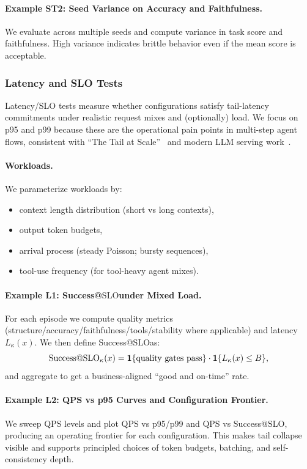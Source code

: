 \documentclass[11pt]{article}
\newcommand{\slo}{\ensuremath{\mathrm{SLO}}}
\begin{document}
\paragraph{Example ST2: Seed Variance on Accuracy and Faithfulness.}
We evaluate across multiple seeds and compute variance in task score and faithfulness.
High variance indicates brittle behavior even if the mean score is acceptable.

\subsubsection{Latency and SLO Tests}

Latency/SLO tests measure whether configurations satisfy tail-latency commitments under realistic request mixes and (optionally) load.
We focus on p95 and p99 because these are the operational pain points in multi-step agent flows, consistent with “The Tail at Scale”~\citep{dean2013tail} and modern LLM serving work~\citep{kwon2023vllm,agrawal2024sarathi}.

\paragraph{Workloads.}
We parameterize workloads by:
\begin{itemize}[leftmargin=12pt]
    \item context length distribution (short vs long contexts),
    \item output token budgets,
    \item arrival process (steady Poisson; bursty sequences),
    \item tool-use frequency (for tool-heavy agent mixes).
\end{itemize}

\paragraph{Example L1: Success@\slo under Mixed Load.}
For each episode we compute quality metrics (structure/accuracy/faithfulness/tools/stability where applicable) and latency $L_\kappa(x)$.
We then define Success@\slo as:
\[
\text{Success@\slo}_\kappa(x)=
\mathbf{1}\{\text{quality gates pass}\}\cdot \mathbf{1}\{L_\kappa(x)\le B\},
\]
and aggregate to get a business-aligned “good and on-time” rate.

\paragraph{Example L2: QPS vs p95 Curves and Configuration Frontier.}
We sweep QPS levels and plot QPS vs p95/p99 and QPS vs Success@\slo, producing an operating frontier for each configuration.
This makes tail collapse visible and supports principled choices of token budgets, batching, and self-consistency depth.
\end{document}
